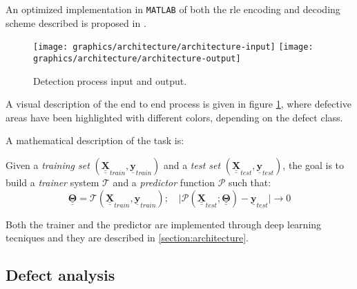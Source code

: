         \par{
            An optimized implementation in \texttt{MATLAB} of both the rle encoding and decoding scheme described is proposed in \cite{antonioterpin:github}.
        }
        \begin{figure}
            \texttt{[image: graphics/architecture/architecture-input]}
            \texttt{[image: graphics/architecture/architecture-output]}
            \caption{Detection process input and output.}\label{fig:exampledetection}
        \end{figure}
        \par{
            A visual description of the end to end process is given in figure \ref{fig:exampledetection}, where defective areas have been highlighted with different colors, depending on the defect class.
        }
        \par{
            A mathematical description of the task is:
        }
        \par{
            Given a \emph{training set} $\left(\underline{\underline{\mathbf{X}}}_{train}, \underline{\mathbf{y}}_{train}\right)$ and a \emph{test set} $\left(\underline{\underline{\mathbf{X}}}_{test}, \underline{\mathbf{y}}_{test}\right)$, the goal is to build a \emph{trainer} system $\mathcal{T}$ and a \emph{predictor} function $\mathcal{P}$ such that:
            \begin{equation*}
                \underline{\underline{\mathbf{\Theta}}} = \mathcal{T}\left(\underline{\underline{\mathbf{X}}}_{train}, \underline{\mathbf{y}}_{train}\right);\quad \lvert \mathcal{P}\left(\underline{\underline{\mathbf{X}}}_{test}; \underline{\underline{\mathbf{\Theta}}}\right) - \underline{\mathbf{y}}_{test} \rvert \rightarrow 0
            \end{equation*}
        }
        \par{
            Both the trainer and the predictor are implemented through deep learning tecniques and they are described in \ref{section:architecture}.
        }

    \subsection{Defect analysis}\label{subsection:defects}
